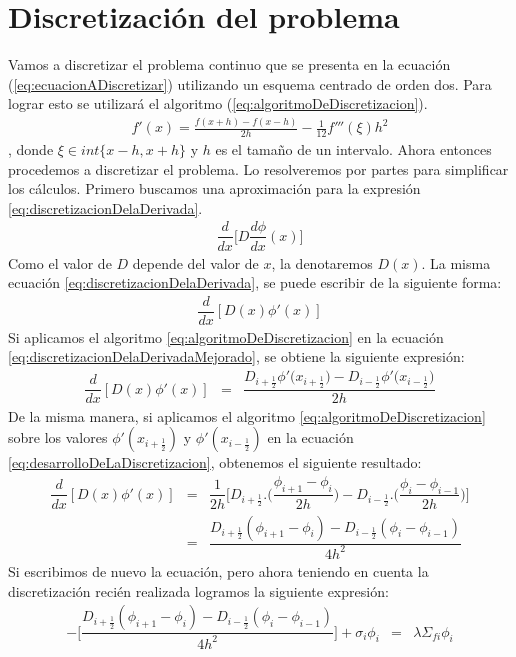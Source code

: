 \documentclass[11pt,a4paper]{emulateapj}
\begin{document}
\section{Discretización del problema}
\label{sec:discretizacion}
Vamos a discretizar el problema continuo que se presenta en la ecuación (\ref{eq:ecuacionADiscretizar}) 
utilizando un esquema centrado de orden dos. Para lograr esto se utilizará el algoritmo (\ref{eq:algoritmoDeDiscretizacion}).
\begin{eqnarray}
\label{eq:algoritmoDeDiscretizacion}
	f'(x) = \frac{f(x+h) - f(x-h)}{2h} - \frac{1}{12} f'''(\xi) h^2
\end{eqnarray}
, donde $\xi \in int\{x-h,x+h\}$ y $h$ es el tamaño de un intervalo.
Ahora entonces procedemos a discretizar el problema. Lo resolveremos por partes para simplificar los cálculos. Primero buscamos una aproximación para la expresión \ref{eq:discretizacionDelaDerivada}.
\begin{eqnarray}
\label{eq:discretizacionDelaDerivada}
	\dfrac{d}{dx}\bigg[D \dfrac{d\phi}{dx}(x)\bigg]  
\end{eqnarray}
Como el valor de $D$ depende del valor de $x$, la denotaremos $D(x)$. La misma ecuación \ref{eq:discretizacionDelaDerivada}, se puede escribir de la siguiente forma:
\begin{eqnarray}
\label{eq:discretizacionDelaDerivadaMejorado}
	\dfrac{d}{dx}[D(x) \phi'(x)]
\end{eqnarray}
Si aplicamos el algoritmo \ref{eq:algoritmoDeDiscretizacion} en la ecuación \ref{eq:discretizacionDelaDerivadaMejorado}, se obtiene la siguiente expresión:
\begin{eqnarray}
\label{eq:desarrolloDeLaDiscretizacion}
	\dfrac{d}{dx}[D(x) \phi'(x)] &=& \dfrac{D_{i+\frac{1}{2}}\phi'\big(x_{i+\frac{1}{2}}\big)  -  D_{i-\frac{1}{2}}\phi'\big(x_{i-\frac{1}{2}}\big)}     {2h} 
\end{eqnarray}
De la misma manera, si aplicamos el algoritmo \ref{eq:algoritmoDeDiscretizacion} sobre los valores $\phi'(x_{i+\frac{1}{2}})$ y $\phi'(x_{i-\frac{1}{2}})$ en la ecuación \ref{eq:desarrolloDeLaDiscretizacion}, obtenemos el siguiente resultado:
\begin{eqnarray}
\label{eq:desarrolloDeLaDiscretizacion2}
	\dfrac{d}{dx}[D(x) \phi'(x)] &=& \dfrac{1}{2h} \bigg[	D_{i+\frac{1}{2}}.\bigg(\dfrac{\phi_{i+1} - \phi_{i}}{2h}\bigg) 	-
			D_{i-\frac{1}{2}}.\bigg(\dfrac{\phi_{i} - \phi_{i-1}}{2h}\bigg) \bigg]	\\
\label{eq:reemplazoDeLaDerivada}
	&=&\dfrac{D_{i+\frac{1}{2}}(\phi_{i+1} - \phi_{i}) - D_{i-\frac{1}{2}}(\phi_{i} - \phi_{i-1})}{4h^2}
\end{eqnarray}
Si escribimos de nuevo la ecuación, pero ahora teniendo en cuenta la discretización recién realizada logramos la siguiente expresión:
\begin{eqnarray}
\label{eq:discretizacionNoFinal}
	-\bigg[\dfrac{D_{i+\frac{1}{2}}(\phi_{i+1} - \phi_{i}) - D_{i-\frac{1}{2}}(\phi_{i} - \phi_{i-1})}{4h^2}\bigg]
	+ \sigma_i \phi_i &=& \lambda \Sigma_{fi} \phi_i
\end{eqnarray}
\end{document}
